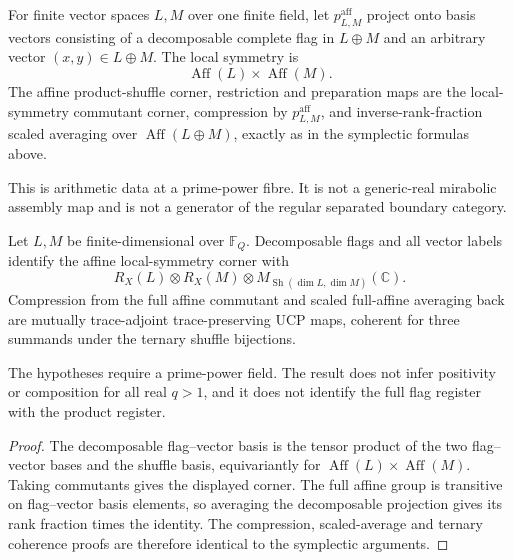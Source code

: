 \begin{definition}
For finite vector spaces $L,M$ over one finite field, let
$p^{\mathrm{aff}}_{L,M}$ project onto basis vectors consisting of a
decomposable complete flag in $L\oplus M$ and an arbitrary vector
$(x,y)\in L\oplus M$.  The local symmetry is
\[
 \operatorname{Aff}(L)\times\operatorname{Aff}(M).
\]
The affine product-shuffle corner, restriction and preparation maps are the
local-symmetry commutant corner, compression by $p^{\mathrm{aff}}_{L,M}$,
and inverse-rank-fraction scaled averaging over $\operatorname{Aff}(L\oplus
M)$, exactly as in the symplectic formulas above.
\end{definition}
\begin{scope}
This is arithmetic data at a prime-power fibre.  It is not a generic-real
mirabolic assembly map and is not a generator of the regular separated
boundary category.
\end{scope}

\begin{theorem}
{\normalfont\statusProved}\quad
Let $L,M$ be finite-dimensional over $\mathbb F_Q$.  Decomposable flags and
all vector labels identify the affine local-symmetry corner with
\[
 R_X(L)\otimes R_X(M)\otimes
 M_{\operatorname{Sh}(\dim L,\dim M)}(\mathbb C).
\]
Compression from the full affine commutant and scaled full-affine averaging
back are mutually trace-adjoint trace-preserving UCP maps, coherent for three
summands under the ternary shuffle bijections.
\end{theorem}
\begin{scope}
The hypotheses require a prime-power field.  The result does not infer
positivity or composition for all real $q>1$, and it does not identify the
full flag register with the product register.
\end{scope}
\begin{proof}
The decomposable flag--vector basis is the tensor product of the two
flag--vector bases and the shuffle basis, equivariantly for
$\operatorname{Aff}(L)\times\operatorname{Aff}(M)$.  Taking commutants gives
the displayed corner.  The full affine group is transitive on flag--vector
basis elements, so averaging the decomposable projection gives its rank
fraction times the identity.  The compression, scaled-average and ternary
coherence proofs are therefore identical to the symplectic arguments.
\end{proof}
